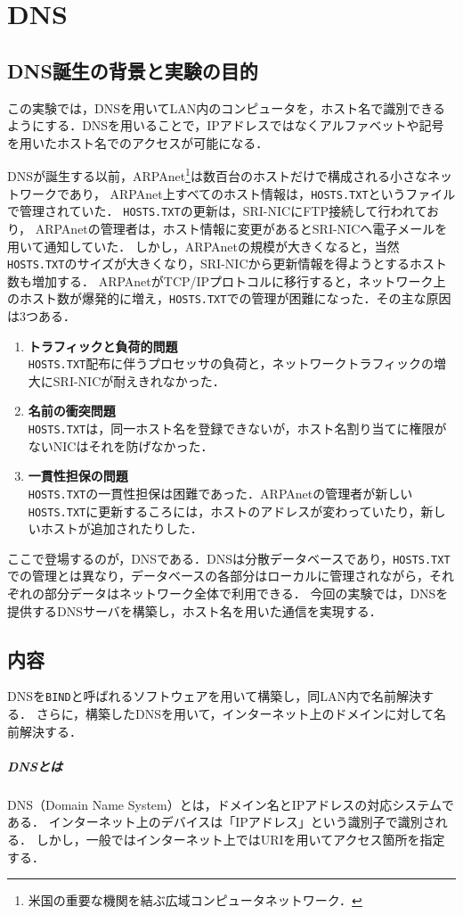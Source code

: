 \chapter{DNS}
\section{DNS誕生の背景と実験の目的}
この実験では，DNSを用いてLAN内のコンピュータを，ホスト名で識別できるようにする．DNSを用いることで，IPアドレスではなくアルファベットや記号を用いたホスト名でのアクセスが可能になる．\par
DNSが誕生する以前，ARPAnet\footnote{米国の重要な機関を結ぶ広域コンピュータネットワーク\cite[p.1]{DNSBIND}．}は数百台のホストだけで構成される小さなネットワークであり，
ARPAnet上すべてのホスト情報は，\texttt{HOSTS.TXT}というファイルで管理されていた．
\texttt{HOSTS.TXT}の更新は，SRI-NICにFTP接続して行われており，
ARPAnetの管理者は，ホスト情報に変更があるとSRI-NICへ電子メールを用いて通知していた．
しかし，ARPAnetの規模が大きくなると，当然\texttt{HOSTS.TXT}のサイズが大きくなり，SRI-NICから更新情報を得ようとするホスト数も増加する\cite[p.3]{DNSBIND}．
ARPAnetがTCP/IPプロトコルに移行すると，ネットワーク上のホスト数が爆発的に増え，\texttt{HOSTS.TXT}での管理が困難になった．その主な原因は3つある．
\begin{enumerate}
    \item \textbf{トラフィックと負荷的問題}\\
          \texttt{HOSTS.TXT}配布に伴うプロセッサの負荷と，ネットワークトラフィックの増大にSRI-NICが耐えきれなかった．
    \item \textbf{名前の衝突問題}\\
          \texttt{HOSTS.TXT}は，同一ホスト名を登録できないが，ホスト名割り当てに権限がないNICはそれを防げなかった．
    \item \textbf{一貫性担保の問題}\\
          \texttt{HOSTS.TXT}の一貫性担保は困難であった．ARPAnetの管理者が新しい\texttt{HOSTS.TXT}に更新するころには，ホストのアドレスが変わっていたり，新しいホストが追加されたりした．
\end{enumerate}
\hfill\cite[p.4]{DNSBIND}\par
ここで登場するのが，DNSである．DNSは分散データベースであり，\texttt{HOSTS.TXT}での管理とは異なり，データベースの各部分はローカルに管理されながら，それぞれの部分データはネットワーク全体で利用できる\cite[p.5]{DNSBIND}．
今回の実験では，DNSを提供するDNSサーバを構築し，ホスト名を用いた通信を実現する．
\section{内容}
DNSを\texttt{BIND}と呼ばれるソフトウェアを用いて構築し，同LAN内で名前解決する．
さらに，構築したDNSを用いて，インターネット上のドメインに対して名前解決する．
\paragraph{DNSとは}DNS（Domain Name System）とは，ドメイン名とIPアドレスの対応システムである．
インターネット上のデバイスは「IPアドレス」という識別子で識別される．
しかし，一般ではインターネット上ではURIを用いてアクセス箇所を指定する．